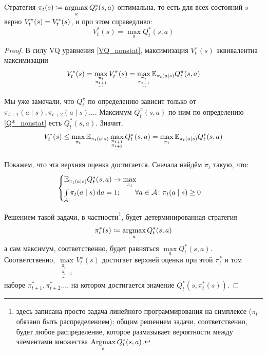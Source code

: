 \begin{theoremBox}[label=th:nonstatbellmancriterion]{}
Cтратегия $\pi_t(s) \coloneqq \mathop{\mathrm{argmax}}\limits_{a} Q^*_t(s, a)$ оптимальна, то есть для всех состояний $s$ верно $V^\pi_t(s) \HM= V^*_t(s)$, и при этом справедливо:
\begin{equation}\label{V*Q*_nonstat}
V^*_t(s) = \max_{a} Q^*_t(s, a)
\end{equation}
\begin{proof}
В силу VQ уравнения \eqref{VQ_nonstat}, максимизация $V^{\pi}_t(s)$ эквивалентна максимизации
$$V^*_t(s) = \max_{\substack{\pi_t \\ \pi_{t+1} \\ \cdots}} V^\pi_t(s) = \max_{\substack{\pi_t \\ \pi_{t+1} \\ \cdots}} \mathbb{E}_{\pi_t(a \mid s)} Q^\pi_t(s, a)$$

Мы уже замечали, что $Q^\pi_t$ по определению зависит только от $\pi_{t+1}(a \mid s), \pi_{t+2}(a \mid s) \dots$. Максимум $Q^\pi_t(s, a)$ по ним по определению \eqref{Q*_nonstat} есть $Q^*_t(s, a)$. Значит,
$$V^*_t(s) \le \max_{\pi_t} \mathbb{E}_{\pi_t(a \mid s)} \max_{\substack{\pi_{t+1} \\ \pi_{t+2} \\ \cdots}} Q^\pi_t(s, a) = \max_{\pi_t} \mathbb{E}_{\pi_t(a \mid s)} Q^*_t(s, a)$$

Покажем, что эта верхняя оценка достигается. Сначала найдём $\pi_t$ такую, что:
$$
\begin{cases}
\mathbb{E}_{\pi_t(a \mid s)} Q^*_t(s, a) \to \max\limits_{\pi_t} \\
\int\limits_{\mathcal{A}} \pi_t(a \mid s) \mathop{}\!\mathrm{d} a = 1; \qquad \forall a \in \mathcal{A} \colon \pi_t(a \mid s) \ge 0
\end{cases}
$$

Решением такой задачи, в частности\footnote{здесь записана просто задача линейного программирования на симплексе ($\pi_t$ обязано быть распределением); общим решением задачи, соответственно, будет любое распределение, которое размазывает вероятности между элементами множества $\mathop{\mathrm{Argmax}}\limits_{a} Q^*_t(s, a)$.}, будет детерминированная стратегия
$$\pi_t^*(s) \coloneqq \mathop{\mathrm{argmax}}_{a} Q^*_t(s, a)$$
а сам максимум, соответственно, будет равняться $\max\limits_{a} Q^*_t(s, a)$. Соответственно, $\max\limits_{\substack{\pi_t \\ \pi_{t+1} \\ \cdots}} V^\pi_t(s)$ достигает верхней оценки при этой $\pi^*_t$ и том наборе $\pi^*_{t+1}, \pi^*_{t+2} \dots$, на котором достигается значение $Q^*_t(s, \pi_t^*(s) )$.
\end{proof}
\end{theoremBox}


